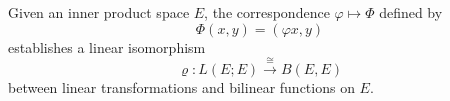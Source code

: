 Given an inner product space $E$, the correspondence $\varphi \mapsto \Phi$ defined by
$$\Phi(x, y) = (\varphi x, y)$$
establishes a linear isomorphism
$$\varrho: L(E; E) \xrightarrow{\cong} B(E, E)$$
between linear transformations and bilinear functions on $E$.
